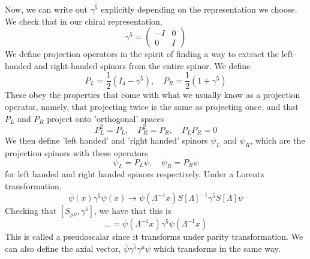 Now, we can write out $ \gamma ^ 5 $ explicitly 
depending on the representation we choose. 
We check that in our chiral representation, 
\[
	\gamma ^ 5 = \begin{pmatrix}  - I & 0 \\ 0 & I  \end{pmatrix} 
\] We define projection operators in the spirit of 
finding a way to extract the left-handed and right-handed spinors 
from the entire spinor. We define  
\[
	P _ L = \frac{1}{2 } ( I _ 4 - \gamma ^ 5 ) , \quad P _ R = \frac{1}{2 } ( 1 + \gamma ^ 5 ) 
\] These obey the properties that come with what 
we usually know as a projection operator, namely, 
that projecting twice is the same as projecting once, 
and that $ P_ L $ and $ P _ R $ project onto 'orthogonal' 
spaces 
\[
 P_ L ^ 2 = P_L , \quad P _ R ^ 2 = P _ R , \quad P _ L P _ R = 0 
\] We then define 'left handed' and 'right handed' spinors
$ \psi _ L $ and $ \psi_ R $, 
which are the projection spinors with these operators 
\[
 \psi _ L = P_L \psi , \quad \psi _ R = P _ R \psi 
\] for left handed and right handed spinors respectively. 
Under a Lorentz transformation, 
\[
	\overline{ \psi } ( x) \gamma ^ 5 \psi ( x) \to \overline{ \psi } ( \Lambda ^{ - 1} x ) 
	S [ \Lambda ] ^{ - 1} \gamma ^ 5 S [ \Lambda ] \psi 
\] Checking that $ [ S_{ \mu\nu } , \gamma ^ 5 ] $, we have that 
this is 
\[
	\dots = \overline{ \psi } ( \Lambda ^{ -1 } x ) \gamma ^ 5 \psi ( \Lambda ^{ - 1} x ) 
\] This is called a pseudoscalar since it transforms under 
parity transformation. We can also define the axial vector, $ \overline{ \psi } \gamma ^ 5 \gamma ^ \mu 
\psi $ which transforms in the same way. 

